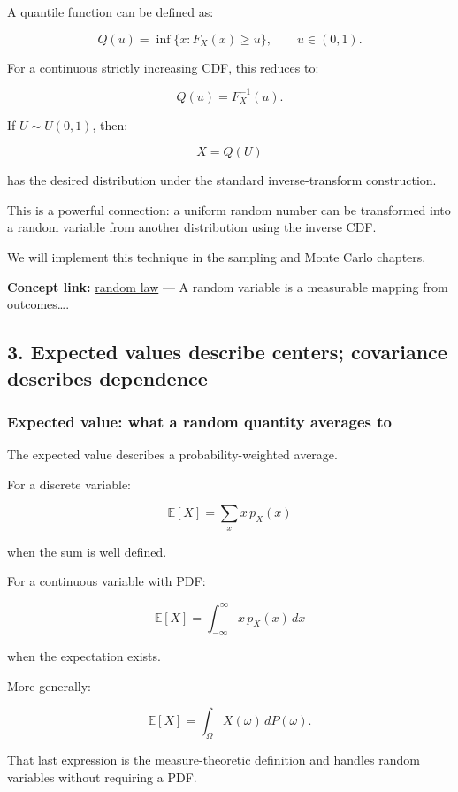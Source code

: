 A quantile function can be defined as:

\[
 \boxed{ Q(u)=\inf\{x:F_X(x)\ge u\} }, \qquad u\in(0,1).
\]

For a continuous strictly increasing CDF, this reduces to:

\[
 Q(u)=F_X^{-1}(u).
\]

If \(U\sim U(0,1)\), then:

\[
 X=Q(U)
\]

has the desired distribution under the standard inverse-transform construction.

This is a powerful connection: a uniform random number can be transformed into a random variable from another distribution using the inverse CDF.

We will implement this technique in the sampling and Monte Carlo chapters.

\textbf{Concept link:} \hyperref[02-foundations-ii-ch023]{random law} --- A random variable is a measurable mapping from outcomes\ldots.

\subsection{3. Expected values describe centers; covariance describes dependence}\label{expected-values-describe-centers-covariance-describes-dependence}

\subsubsection{Expected value: what a random quantity averages to}\label{expected-value-what-a-random-quantity-averages-to}

The expected value describes a probability-weighted average.

For a discrete variable:

\[
 \boxed{ \mathbb E[X]=\sum_xx\,p_X(x) }
\]

when the sum is well defined.

For a continuous variable with PDF:

\[
 \boxed{ \mathbb E[X]= \int_{-\infty}^{\infty}x\,p_X(x)\,dx }
\]

when the expectation exists.

More generally:

\[
 \mathbb E[X]=\int_\Omega X(\omega)\,dP(\omega).
\]

That last expression is the measure-theoretic definition and handles random variables without requiring a PDF.

